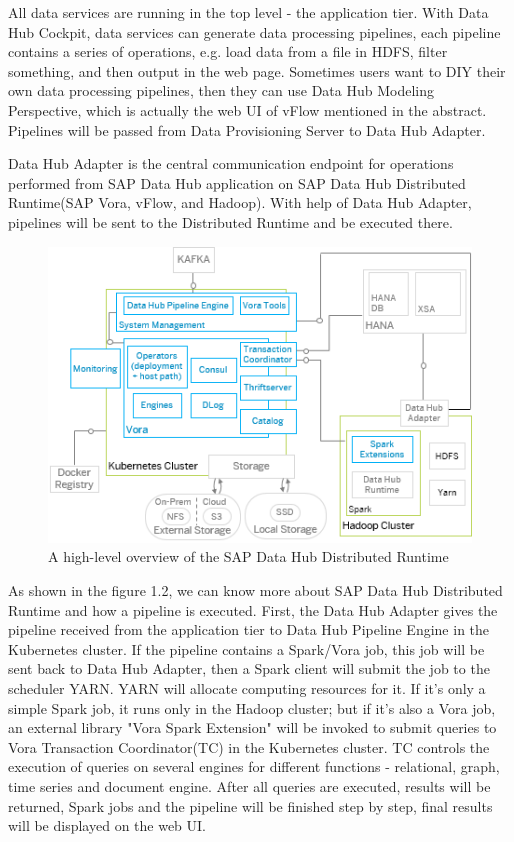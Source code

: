 \documentclass[article,colorback,accentcolor=tud4c]{tudreport}
\begin{document}
All data services are running in the top level - the application tier. With Data Hub Cockpit, data services can generate data processing pipelines, each pipeline contains a series of operations, e.g. load data from a file in HDFS, filter something, and then output in the web page. Sometimes users want to DIY their own data processing pipelines, then they can use Data Hub Modeling Perspective, which is actually the web UI of vFlow mentioned in the abstract. Pipelines will be passed from Data Provisioning Server to Data Hub Adapter. 

Data Hub Adapter is the central communication endpoint for operations performed from SAP Data Hub application on SAP Data Hub Distributed Runtime(SAP Vora, vFlow, and Hadoop). With help of Data Hub Adapter, pipelines will be sent to the Distributed Runtime and be executed there.

\begin{figure}[!h]
	\centering
	\includegraphics{vora}
	\caption{A high-level overview of the SAP Data Hub Distributed Runtime\cite{vora and data hub}}
\end{figure}

As shown in the figure 1.2, we can know more about SAP Data Hub Distributed Runtime and how a pipeline is executed. First, the Data Hub Adapter gives the pipeline received from the application tier to Data Hub Pipeline Engine in the Kubernetes cluster. If the pipeline contains a Spark/Vora job, this job will be sent back to Data Hub Adapter, then a Spark client will submit the job to the scheduler YARN. YARN will allocate computing resources for it. If it's only a simple Spark job, it runs only in the Hadoop cluster; but if it's also a Vora job, an external library "Vora Spark Extension" will be invoked to submit queries to Vora Transaction Coordinator(TC) in the Kubernetes cluster. TC controls the execution of queries on several engines for different functions - relational, graph, time series and document engine. After all queries are executed, results will be returned, Spark jobs and the pipeline will be finished step by step, final results will be displayed on the web UI. 
\end{document}
